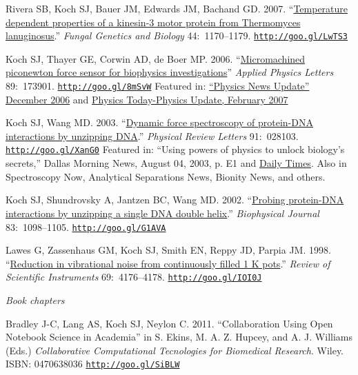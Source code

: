 \documentclass[11pt]{article}
\begin{document}
\ind Rivera SB, Koch SJ, Bauer JM, Edwards JM, Bachand GD. 2007. ``\href{http://goo.gl/LwTS3}{Temperature dependent properties of a kinesin-3 motor protein from Thermomyces lanuginosus}.'' \emph{Fungal Genetics and Biology} 44:~1170--1179. {\scriptsize  \texttt{\href{http://goo.gl/LwTS3}{http://goo.gl/LwTS3}}}


\ind Koch SJ, Thayer GE, Corwin AD, de Boer MP. 2006. ``\href{http://goo.gl/8mSvW}{Micromachined piconewton force sensor for biophysics investigations}'' \emph{Applied Physics Letters} 89:~173901. {\scriptsize  \texttt{\href{http://goo.gl/8mSvW}{http://goo.gl/8mSvW}}} Featured in: \href{http://goo.gl/2m7LF}{“Physics News Update” December 2006} and \href{http://goo.gl/lYdCy}{Physics Today-Physics Update, February 2007}  


\ind Koch SJ, Wang MD. 2003. ``\href{http://goo.gl/XanG0}{Dynamic force spectroscopy of protein-DNA interactions by unzipping DNA}.'' \emph{Physical Review Letters} 91:~028103. {\scriptsize  \texttt{\href{http://goo.gl/XanG0}{http://goo.gl/XanG0}}} Featured in: “Using powers of physics to unlock biology's secrets,” Dallas Morning News, August 04, 2003, p. E1 and \href{http://goo.gl/2m7LF}{Daily Times}. Also in Spectroscopy Now, Analytical Separations News, Bionity News, and others.


\ind Koch SJ, Shundrovsky A, Jantzen BC, Wang MD. 2002.  ``\href{http://goo.gl/G1AVA}{Probing protein-DNA interactions by unzipping a single DNA double helix}.'' \emph{Biophysical Journal} 83:~1098--1105. {\scriptsize  \texttt{\href{http://goo.gl/G1AVA}{http://goo.gl/G1AVA}}}


\ind Lawes G, Zassenhaus GM, Koch SJ, Smith EN, Reppy JD, Parpia JM. 1998. ``\href{http://goo.gl/IOI0J}{Reduction in vibrational noise from continuously filled 1 K pots}.''  \emph{Review of Scientific Instruments}
69:~4176--4178. {\scriptsize  \texttt{\href{http://goo.gl/IOI0J}{http://goo.gl/IOI0J}}}



\bigskip

\noindent\emph{Book chapters \vspace{0.05in}}

\ind Bradley J-C, Lang AS, Koch SJ, Neylon C. 2011. ``Collaboration Using Open Notebook Science in Academia'' in S. Ekins, M. A. Z. Hupcey, and A. J. Williams (Eds.) \emph{Collaborative Computational Tecnologies for Biomedical Research}. Wiley. ISBN: 0470638036 {\scriptsize  \texttt{\href{http://goo.gl/SiBLW}{http://goo.gl/SiBLW}}}
\end{document}
